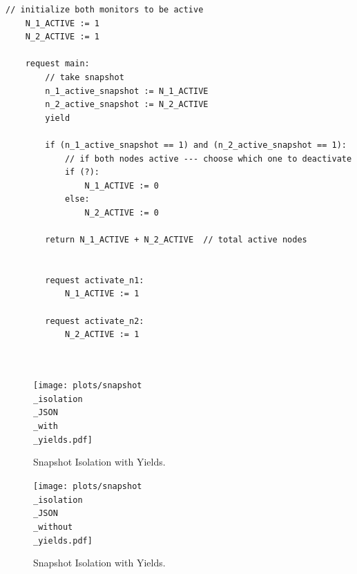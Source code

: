 \begin{minipage}[t]{1.0\textwidth}
\begin{lstlisting}[caption={Snapshot-based monitor deactivation (not serializable, as it can return a sume of 0 active monitors)}]
	// initialize both monitors to be active
    N_1_ACTIVE := 1
    N_2_ACTIVE := 1
	
    request main:
        // take snapshot
        n_1_active_snapshot := N_1_ACTIVE
        n_2_active_snapshot := N_2_ACTIVE
        yield
		
        if (n_1_active_snapshot == 1) and (n_2_active_snapshot == 1):
            // if both nodes active --- choose which one to deactivate 
            if (?): 
                N_1_ACTIVE := 0
            else:
                N_2_ACTIVE := 0

        return N_1_ACTIVE + N_2_ACTIVE  // total active nodes
        
        
        request activate_n1:
        	N_1_ACTIVE := 1
        
        request activate_n2:
        	N_2_ACTIVE := 1
        
        
\end{lstlisting}
\end{minipage}
	



\begin{figure}[h]
	\centering
\texttt{[image: plots/snapshot\\\_isolation\\\_JSON\\\_with\\\_yields.pdf]}
	\caption{Snapshot Isolation with Yields.}
	\label{fig:snapshotIsolationJsonWithYields}
\end{figure}




\begin{figure}[h]
	\centering
	\texttt{[image: plots/snapshot\\\_isolation\\\_JSON\\\_without\\\_yields.pdf]}
	\caption{Snapshot Isolation with Yields.}
	\label{fig:snapshotIsolationJsonWithoutYields}
\end{figure}


